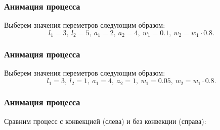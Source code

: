 \documentclass[10pt,pdf,hyperref={unicode}]{beamer}
\begin{document}
\begin{frame}
 \frametitle{Анимация процесса}
 Выберем значения переметров следующим образом:
  \begin{equation*}
    l_1=3,\ l_2=5,\ a_1=2,\ a_2=4,\ w_1=0.1,\ w_2=w_1 \cdot 0.8.
  \end{equation*}
 \begin{center}
 \end{center}
\end{frame}


\begin{frame}
 \frametitle{Анимация процесса}
 Выберем значения переметров следующим образом:
  \begin{equation*}
    l_1=3,\ l_2=1,\ a_1=4,\ a_2=1,\ w_1=0.05,\ w_2=w_1 \cdot 0.8.
  \end{equation*}
 \begin{center}
 \end{center}
\end{frame}

\begin{frame}
 \frametitle{Анимация процесса}
 Сравним процесс с конвекцией (слева) и без конвекции (справа):
 \begin{center}
 \end{center}
\end{frame}
\end{document}
